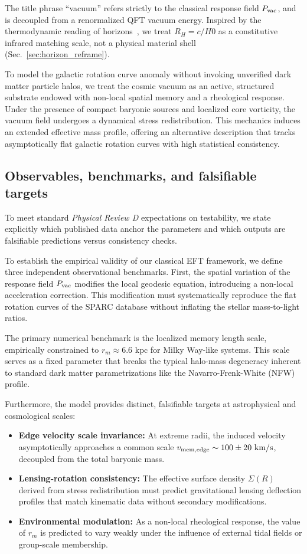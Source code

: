 \documentclass[prd,
               reprint,
               aps,
               preprintnumbers,
               nofootinbib,
               longbibliography,
               floatfix]{revtex4-2}
\begin{document}
The title phrase ``vacuum'' refers strictly to the classical 
response field $P_{\rm vac}$, and is decoupled from a 
renormalized QFT vacuum energy. Inspired by the thermodynamic 
reading of horizons~\cite{Jacobson1995}, we treat 
$R_H=c/H0$ as a constitutive infrared matching scale, not a 
physical material shell (Sec.~\ref{sec:horizon_reframe}).

To model the galactic rotation curve anomaly without invoking 
unverified dark matter particle halos, we treat the cosmic 
vacuum as an active, structured substrate endowed with 
non-local spatial memory and a rheological response. Under 
the presence of compact baryonic sources and localized core 
vorticity, the vacuum field undergoes a dynamical stress 
redistribution. This mechanics induces an extended effective 
mass profile, offering an alternative description that tracks 
asymptotically flat galactic rotation curves with high 
statistical consistency.


\subsection{Observables, benchmarks, and falsifiable targets}
\label{sec:observables_prd}

To meet standard \emph{Physical Review D} expectations on testability, we
state explicitly which published data anchor the parameters and which
outputs are falsifiable predictions versus consistency checks.

To establish the empirical validity of our classical EFT framework,
we define three independent observational benchmarks. First, the
spatial variation of the response field $P_{\rm vac}$ modifies the
local geodesic equation, introducing a non-local acceleration
correction. This modification must systematically reproduce the flat
rotation curves of the SPARC database without inflating the stellar
mass-to-light ratios.

The primary numerical benchmark is the localized memory length scale,
empirically constrained to $r_m \approx 6.6\text{ kpc}$ for Milky
Way-like systems. This scale serves as a fixed parameter that breaks
the typical halo-mass degeneracy inherent to standard dark matter
parametrizations like the Navarro-Frenk-White (NFW) profile.

Furthermore, the model provides distinct, falsifiable targets at
astrophysical and cosmological scales:
\begin{itemize}
\item \textbf{Edge velocity scale invariance:} At extreme radii, the
induced velocity asymptotically approaches a common scale
$v_{\rm mem, edge} \sim 100 \pm 20\text{ km/s}$, decoupled from the
total baryonic mass.
\item \textbf{Lensing-rotation consistency:} The effective surface
density $\Sigma(R)$ derived from stress redistribution must predict
gravitational lensing deflection profiles that match kinematic data
without secondary modifications.
\item \textbf{Environmental modulation:} As a non-local rheological
response, the value of $r_m$ is predicted to vary weakly under the
influence of external tidal fields or group-scale membership.
\end{itemize}
\end{document}

